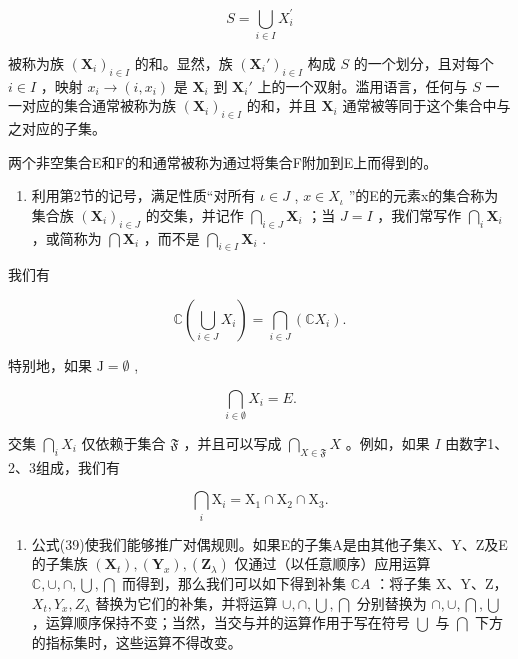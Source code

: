 \[
S = \bigcup_ {i \in I} X _ {i} ^ {\prime}
\]

被称为族 \((\mathbf{X}_i)_{i\in I}\) 的和。显然，族 \((\mathbf{X}_i')_{i\in I}\) 构成 \(S\) 的一个划分，且对每个 \(i\in I\) ，映射 \(x_i\to (i,x_i)\) 是 \(\mathbf{X}_i\) 到 \(\mathbf{X}_i'\) 上的一个双射。滥用语言，任何与 \(S\) 一一对应的集合通常被称为族 \((\mathbf{X}_i)_{i\in I}\) 的和，并且 \(\mathbf{X}_i\) 通常被等同于这个集合中与之对应的子集。

两个非空集合E和F的和通常被称为通过将集合F附加到E上而得到的。

\begin{enumerate}
\def\labelenumi{\arabic{enumi}.}
\setcounter{enumi}{5}
\tightlist
\item
  利用第2节的记号，满足性质“对所有 \(\iota\in J\) , \(x\in X_{\iota}\) ”的E的元素x的集合称为集合族 \((\mathbf{X}_i)_{i \in J}\) 的交集，并记作 \(\bigcap_{i \in J} \mathbf{X}_i\) ；当 \(J = I\) ，我们常写作 \(\bigcap_{i} \mathbf{X}_i\) ，或简称为 \(\bigcap \mathbf{X}_i\) ，而不是 \(\bigcap_{i \in I} \mathbf{X}_i\) .
\end{enumerate}

我们有

\[
\mathbb {C} \left(\bigcup_ {i \in J} X _ {i}\right) = \bigcap_ {i \in J} \left(\mathbb {C} X _ {i}\right).\tag{39}
\]

特别地，如果 \(\mathrm{J} = \emptyset\) ,

\[
\bigcap_ {i \in \emptyset} X _ {i} = E.\tag{40}
\]

交集 \(\bigcap_{i} X_i\) 仅依赖于集合 \(\mathfrak{F}\) ，并且可以写成 \(\bigcap_{X \in \mathfrak{F}} X\) 。例如，如果 \(I\) 由数字1、2、3组成，我们有

\[
\bigcap_ {i} \mathrm{X} _ {i} = \mathrm{X} _ {1} \cap \mathrm{X} _ {2} \cap \mathrm{X} _ {3}.
\]

\begin{enumerate}
\def\labelenumi{\arabic{enumi}.}
\setcounter{enumi}{6}
\tightlist
\item
  公式(39)使我们能够推广对偶规则。如果E的子集A是由其他子集X、Y、Z及E的子集族 \((\mathbf{X}_{t}), (\mathbf{Y}_{x}), (\mathbf{Z}_{\lambda})\) 仅通过（以任意顺序）应用运算 \(\mathbb C, \cup, \cap, \bigcup, \bigcap\) 而得到，那么我们可以如下得到补集 \(\mathbb C A\) ：将子集 X、Y、Z， \(X_{t}, Y_{x}, Z_{\lambda}\) 替换为它们的补集，并将运算 \(\cup, \cap, \bigcup, \bigcap\) 分别替换为 \(\cap, \cup, \bigcap, \bigcup\) ，运算顺序保持不变；当然，当交与并的运算作用于写在符号 \(\bigcup\) 与 \(\bigcap\) 下方的指标集时，这些运算不得改变。
\end{enumerate}


